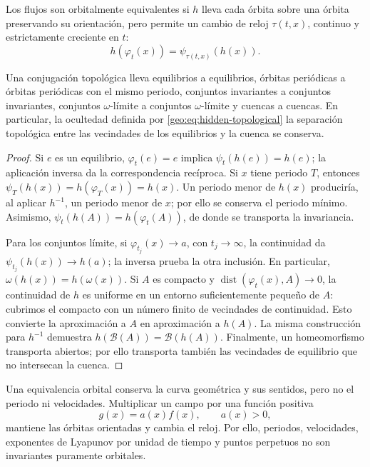 \begin{definition}
Los flujos son orbitalmente equivalentes si \(h\) lleva cada órbita sobre una
órbita preservando su orientación, pero permite un cambio de reloj
\(\tau(t,x)\), continuo y estrictamente creciente en \(t\):
\begin{equation}
 h(\varphi_t(x))=\psi_{\tau(t,x)}(h(x)).
 \label{geo:eq:orbital-equivalence}
\end{equation}
\end{definition}

\begin{proposition}
Una conjugación topológica lleva equilibrios a equilibrios, órbitas periódicas
a órbitas periódicas con el mismo periodo, conjuntos invariantes a conjuntos
invariantes, conjuntos \(\omega\)-límite a conjuntos \(\omega\)-límite y
cuencas a cuencas. En particular,
\ifHAFOBasinMaterial
la ocultedad definida por \eqref{geo:eq:hidden-topological}
\else
la separación topológica entre las vecindades de los equilibrios y la cuenca
\fi
se conserva.
\end{proposition}

\begin{proof}
Si \(e\) es un equilibrio, \(\varphi_t(e)=e\) implica
\(\psi_t(h(e))=h(e)\); la aplicación inversa da la correspondencia
recíproca. Si \(x\) tiene periodo \(T\), entonces
\(\psi_T(h(x))=h(\varphi_T(x))=h(x)\). Un periodo menor de \(h(x)\)
produciría, al aplicar \(h^{-1}\), un periodo menor de \(x\); por ello se
conserva el periodo mínimo. Asimismo,
\(\psi_t(h(A))=h(\varphi_t(A))\), de donde se transporta la invariancia.

Para los conjuntos límite, si \(\varphi_{t_j}(x)\to a\), con
\(t_j\to\infty\), la continuidad da
\(\psi_{t_j}(h(x))\to h(a)\); la inversa prueba la otra inclusión.
En particular, \(\omega(h(x))=h(\omega(x))\). Si \(A\) es compacto y
\(\operatorname{dist}(\varphi_t(x),A)\to0\), la continuidad de \(h\)
es uniforme en un entorno suficientemente pequeño de \(A\): cubrimos el
compacto con un número finito de vecindades de continuidad. Esto convierte
la aproximación a \(A\) en aproximación a \(h(A)\). La misma construcción
para \(h^{-1}\) demuestra
\(h(\mathcal B(A))=\mathcal B(h(A))\). Finalmente, un homeomorfismo
transporta abiertos; por ello transporta también las vecindades de equilibrio
que no intersecan la cuenca.
\end{proof}

Una equivalencia orbital conserva la curva geométrica y sus sentidos, pero no
el periodo ni velocidades. Multiplicar un campo por una función positiva
\begin{equation}
 g(x)=a(x)f(x),\qquad a(x)>0,
 \label{geo:eq:positive-time-rescaling}
\end{equation}
mantiene las órbitas orientadas y cambia el reloj. Por ello, periodos,
velocidades, exponentes de Lyapunov por unidad de tiempo y puntos perpetuos no
son invariantes puramente orbitales.

